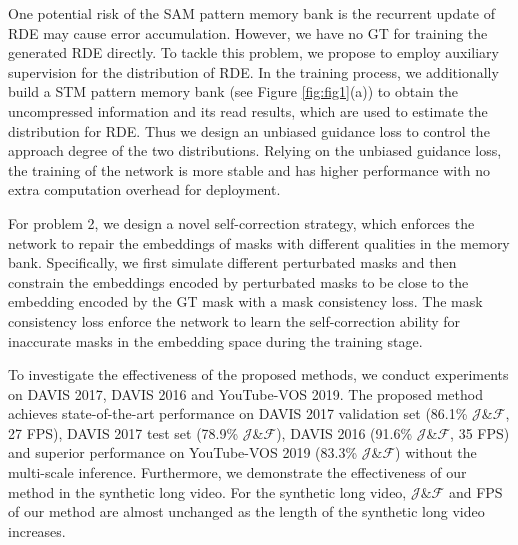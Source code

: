 \documentclass[10pt,twocolumn,letterpaper]{article}
\begin{document}
One potential risk of the SAM pattern memory bank is the recurrent update of RDE may cause error accumulation. However, we have no GT for training the generated RDE directly. To tackle this problem, we propose to employ auxiliary supervision for the distribution of RDE. In the training process, we additionally build a STM pattern memory bank (see Figure \ref{fig:fig1}(a)) to obtain the uncompressed information and its read results, which are used to estimate the distribution for RDE. Thus we design an unbiased guidance loss to control the approach degree of the two distributions. Relying on the unbiased guidance loss, the training of the network is more stable and has higher performance with no extra computation overhead for deployment.



For problem 2, we design a novel self-correction strategy, which enforces the network to repair the embeddings of masks with different qualities in the memory bank. Specifically, we first simulate different perturbated masks and then constrain the embeddings encoded by perturbated masks to be close to the embedding encoded by the GT mask with a mask consistency loss. The mask consistency loss enforce the network to learn the self-correction ability for inaccurate masks in the embedding space during the training stage.

To investigate the effectiveness of the proposed methods, we conduct experiments on DAVIS 2017, DAVIS 2016 and YouTube-VOS 2019. The proposed method achieves state-of-the-art performance on DAVIS 2017 validation set (86.1\%  $\mathcal{J}$\&$\mathcal{F}$, 27 FPS), DAVIS 2017 test set (78.9\%  $\mathcal{J}$\&$\mathcal{F}$), DAVIS 2016  (91.6\% $\mathcal{J}$\&$\mathcal{F}$, 35 FPS) and superior performance on YouTube-VOS 2019 (83.3\% $\mathcal{J}$\&$\mathcal{F}$) without the multi-scale inference. Furthermore, we  demonstrate the effectiveness of our method in the synthetic long video. For the synthetic long video, $\mathcal{J}\&\mathcal{F}$ and FPS of our method are almost unchanged as the length of the synthetic long video increases.
\end{document}
